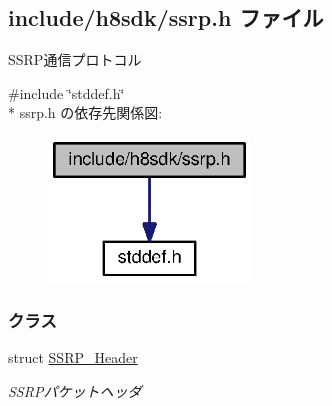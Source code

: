 \subsection{include/h8sdk/ssrp.h ファイル}
\label{ssrp_8h}


S\+S\+R\+P通信プロトコル  


{\ttfamily \#include \char`\"{}stddef.\+h\char`\"{}}\\*
ssrp.\+h の依存先関係図\+:
\nopagebreak
\begin{figure}[H]
\begin{center}
\leavevmode
\includegraphics[width=152pt]{d1/de2/ssrp_8h__incl}
\end{center}
\end{figure}
\subsubsection*{クラス}
\begin{DoxyCompactItemize}
\item 
struct \hyperlink{ssrp_8h_d2/df5/structSSRP__Header}{S\+S\+R\+P\+\_\+\+Header}
\begin{DoxyCompactList}\small\item\em S\+S\+R\+Pパケットヘッダ \end{DoxyCompactList}\end{DoxyCompactItemize}
